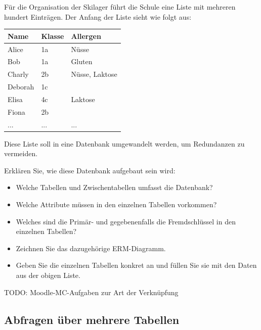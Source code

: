 \begin{myexercise}
  Für die Organisation der Skilager führt die Schule eine Liste mit mehreren hundert Einträgen. Der Anfang der Liste sieht wie folgt aus:

  \begin{tabular}{l|l|l}
    Name	& Klasse&	Allergen \\ \hline 
    Alice	&1a	&Nüsse \\
    Bob	&1a	&Gluten \\
    Charly	&2b	&Nüsse, Laktose \\
    Deborah	&1c&	 \\
    Elisa	&4c	&Laktose \\
    Fiona	&2b	& \\
    ...	&...	&...
  \end{tabular}


Diese Liste soll in eine Datenbank umgewandelt werden, um Redundanzen zu vermeiden.

Erklären Sie, wie diese Datenbank aufgebaut sein wird:

\begin{itemize}
  \item Welche Tabellen und Zwischentabellen umfasst die Datenbank?
  \item Welche Attribute müssen in den einzelnen Tabellen vorkommen?
  \item Welches sind die Primär- und gegebenenfalls die Fremdschlüssel in den einzelnen Tabellen?
  \item Zeichnen Sie das dazugehörige ERM-Diagramm.
  \item Geben Sie die einzelnen Tabellen konkret an und füllen Sie sie mit den Daten aus der obigen Liste.
\end{itemize}
\end{myexercise}

TODO: Moodle-MC-Aufgaben zur Art der Verknüpfung



















\subsection{Abfragen über mehrere Tabellen}

